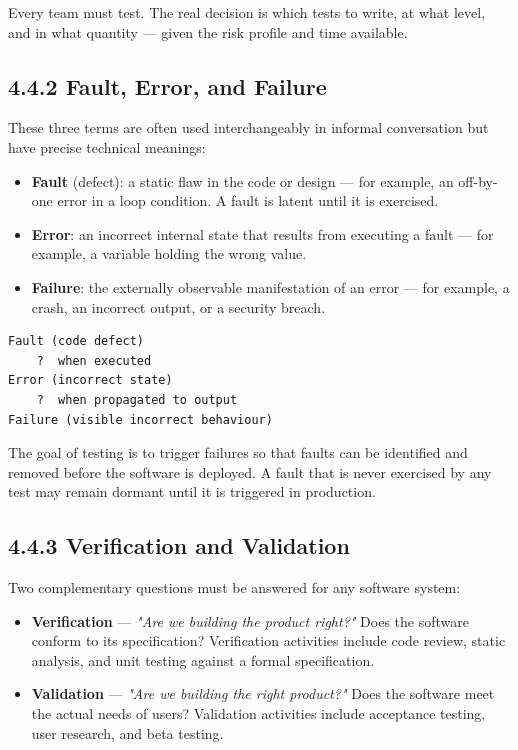 \documentclass[11pt,a4paper]{book}
\begin{document}
Every team must test. The real decision is which tests to write, at what level, and in what quantity --- given the risk profile and time available.

\subsection{4.4.2 Fault, Error, and Failure}

These three terms are often used interchangeably in informal conversation but have precise technical meanings:

\begin{itemize}
  \item \textbf{Fault} (defect): a static flaw in the code or design --- for example, an off-by-one error in a loop condition. A fault is latent until it is exercised.
  \item \textbf{Error}: an incorrect internal state that results from executing a fault --- for example, a variable holding the wrong value.
  \item \textbf{Failure}: the externally observable manifestation of an error --- for example, a crash, an incorrect output, or a security breach.
\end{itemize}

\begin{lstlisting}
Fault (code defect)
    ?  when executed
Error (incorrect state)
    ?  when propagated to output
Failure (visible incorrect behaviour)
\end{lstlisting}

The goal of testing is to trigger failures so that faults can be identified and removed before the software is deployed. A fault that is never exercised by any test may remain dormant until it is triggered in production.

\subsection{4.4.3 Verification and Validation}

Two complementary questions must be answered for any software system:

\begin{itemize}
  \item \textbf{Verification} --- \textit{"Are we building the product right?"} Does the software conform to its specification? Verification activities include code review, static analysis, and unit testing against a formal specification.
  \item \textbf{Validation} --- \textit{"Are we building the right product?"} Does the software meet the actual needs of users? Validation activities include acceptance testing, user research, and beta testing.
\end{itemize}
\end{document}
